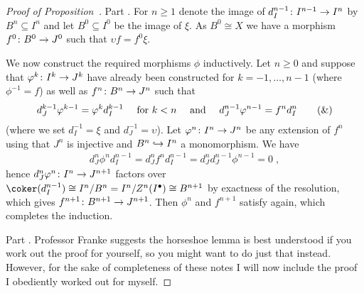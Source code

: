 \documentclass[a4paper,parskip=half,numbers=enddot, DIV=12]{scrreprt}
\renewcommand{\geq}{\geqslant}
\begin{document}
\begin{proof}[Proof of Proposition~]
	Part . For $n\geq 1$ denote the image of $d_{I }^{n-1}\colon I^{n-1}\morphism I^n$ by $B^n\subseteq I^n$ and let $B^0\subseteq I^0$ be the image of $\xi$. As $B^0\cong X$ we have a morphism $f^0\colon B^0\morphism J^0$ such that $\upsilon f=f^0\xi$.
	
	We now construct the required morphisms $\phi $ inductively. Let $n\geq 0$ and suppose that $\phi^k\colon I^k\morphism J^k$ have already been constructed for $k=-1,\ldots,n-1$ (where $\phi^{-1}=f$) as well as $f^n\colon B^n\morphism J^n$ such that
	\begin{align}\lbl{eq:Horseshoe1}
		d_{J }^{k-1}\phi^{k-1}=\phi^kd_{I }^{k-1}\quad\text{ for }k< n\quad\text{ and }\quad d_{J  }^{n-1}\phi^{n-1}=f^nd_{I }^n\tag{\&}
	\end{align}
	(where we set $d_{I }^{-1}=\xi$ and $d_{J }^{-1}=\upsilon$). Let $\phi^n\colon I^n\morphism J^n$ be any extension of $f^n$ using that $J^n$ is injective and $B^n\monomorphism I^n$ a monomorphism. We have
	\begin{align*}
		d_{J }^{n}\phi ^nd_{I }^{n-1}=d_{J }^{n}f^nd_{I }^{n-1}=d_{J }^nd_{J }^{n-1}\phi^{n-1}=0\;,
	\end{align*}
	hence $d_{J }^n\phi^n\colon I^n\morphism J^{n+1}$ factors over $\coker(d_{I }^{n-1})\cong I^n/B^n=I^n/Z^n(I^\bullet )\cong B^{n+1}$ by exactness of the resolution, which gives $f^{n+1}\colon B^{n+1}\morphism J^{n+1}$. Then $\phi^n$ and $f^{n+1}$ satisfy  again, which completes the induction.
	
	Part . Professor Franke suggests the horseshoe lemma is best understood if you work out the proof for yourself, so you might want to do just that instead. However, for the sake of completeness of these notes I will now include the proof I obediently worked out for myself.
	

\end{proof}
\end{document}
